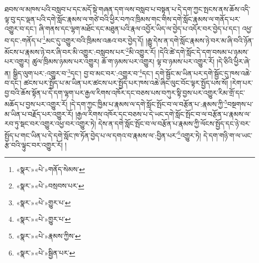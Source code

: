 ཐབས་ལ་མཁས་པའི་བསླབ་པ་དང་མདོ་སྡེ་གཞན་དག་ལས་བསླབ་པ་བསྟན་པ་དེ་དག་ཀྱང་སྤངས་ནས་ཆོས་འདི་ལྟ་བུ་དང་ལྡན་པའི་དགེ་སློང་རྣམས་ལ་གཙེ་བའི་ཕྱིར་བཀའ་ཁྲིམས་གང་གིས་དགེ་སློང་རྣམས་ལ་གནོད་པར་འགྱུར་བ་དང་། ཞི་གནས་དང་ལྷག་མཐོང་དང་མཐུན་པའི་རྣལ་འབྱོར་ཡིད་ལ་བྱེད་པ་འདོར་བར་བྱེད་པ་དང་། འཕྱ་བ་དང་:གནོད་པ་\footnote{«སྣར་»«པེ་»གནོད་སེམས་}མང་དུ་འགྱུར་བའི་ཁྲིམས་འཆའ་བར་བྱེད་དོ། །རྒྱུ་དེས་ན་དགེ་སློང་རྣམས་ཉེ་བར་མ་ཞི་བའི་ཉོན་མོངས་པ་རྣམས་ཉེ་བར་ཞི་བར་མི་འགྱུར་:བསླབས་པར་\footnote{«སྣར་»«པེ་»བསྲབས་པར་}མི་འགྱུར་རོ། །དེའི་ཚེ་དགེ་སློང་དེ་དག་བསམ་པ་ཉམས་པར་འགྱུར། ཚུལ་ཁྲིམས་ཉམས་པར་འགྱུར། ཆོ་ག་ཉམས་པར་འགྱུར། ལྟ་བ་ཉམས་པར་འགྱུར་རོ། །དེ་ཅིའི་ཕྱིར་ཞེ་ན། སྒྱིད་ལུག་པར་:འགྱུར་བ་\footnote{«སྣར་»«པེ་»གྱུར་པ་}དང་། བྱ་བ་མང་བར་:འགྱུར་བ་\footnote{«སྣར་»«པེ་»གྱུར་པ་}དང་། དགེ་སྦྱོང་མ་ཡིན་པར་དགེ་སྦྱོང་དུ་ཁས་འཆེ་བ་དང་། ཚངས་པར་སྤྱོད་པ་མ་ཡིན་པར་ཚངས་པར་སྤྱོད་པར་ཁས་འཆེ་ཞིང་ལུང་བོང་ལྟར་སྤྱོད་པས་སོ། །རེག་པར་བྱ་བའི་ཆོས་སྟོན་པ་དེ་དག་ལྷག་པར་རྒྱལ་རིགས་འཁོར་དང་བཅས་པས་བཀུར་སྟི་བྱས་པར་འགྱུར་རིམ་གྲོ་དང་མཆོད་པ་བྱས་པར་འགྱུར་རོ། །དེ་དག་ཀྱང་ཁྱིམ་པ་རྣམས་ལ་དགེ་སློང་སྤོང་བ་ལ་བརྩོན་པ་:རྣམས་ཀྱི་\footnote{«སྣར་»«པེ་»རྣམས་ཀྱིས་}བསྔགས་པ་མ་ཡིན་པ་བརྗོད་པར་འགྱུར་རོ། །རྒྱལ་རིགས་འཁོར་དང་བཅས་པ་དེ་ཡང་དགེ་སློང་སྤོང་བ་ལ་བརྩོན་པ་རྣམས་ལ་རབ་ཏུ་སྡང་བར་འགྱུར་འཕྱ་བར་འགྱུར་ཏེ། དེས་ན་དགེ་སློང་སྤོང་བ་ལ་བརྩོན་པ་རྣམས་ཀྱི་ལོངས་སྤྱོད་དང་ཉེ་བར་སྤྱོད་པ་གང་ཡིན་པ་དེ་དགེ་སློང་ཁ་ཏོན་བྱེད་པ་ལ་དགའ་བ་རྣམས་ལ་:བྱིན་པར་\footnote{«སྣར་»«པེ་»སྦྱིན་པར་}འགྱུར་ཏེ། དེ་དག་གཉི་ག་ལ་ཡང་རྩ་བའི་ལྟུང་བར་འགྱུར་རོ། །
